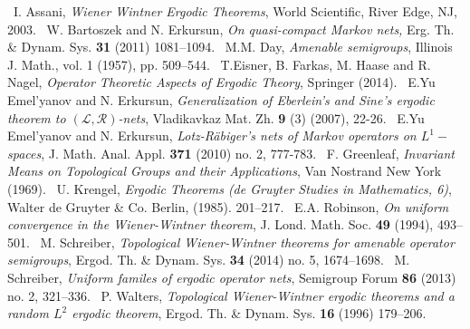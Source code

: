 \documentclass{amsart}
\theoremstyle{definition}
\theoremstyle{remark}
\numberwithin{equation}{section}
\begin{document}
\begin{thebibliography}{12}
\bibitem {} \ I. Assani, {\it Wiener Wintner Ergodic Theorems}, World Scientific,
River Edge, NJ, 2003.
\bibitem {} \ W. Bartoszek and N. Erkursun, {\it On quasi-compact Markov nets,}
Erg. Th. \& Dynam. Sys. {\bf 31} (2011) 1081--1094.
\bibitem {} \ M.M. Day, {\it Amenable semigroups}, Illinois J. Math., vol. 1 (1957),
pp. 509--544.
\bibitem {} \ T.Eisner, B. Farkas, M. Haase and R. Nagel, {\it Operator Theoretic Aspects
of Ergodic Theory}, Springer (2014).
\bibitem {} \ E.Yu Emel'yanov and N. Erkursun, {\it Generalization of Eberlein's
and Sine's ergodic theorem to $(\mathcal{L}, \mathcal{R})$-nets}, Vladikavkaz Mat. Zh.
{\bf 9} (3) (2007), 22-26.
\bibitem {} \ E.Yu Emel'yanov and N. Erkursun, {\it Lotz-R\"abiger's nets of Markov
operators on $L^1-$spaces}, J. Math. Anal. Appl. {\bf 371} (2010) no. 2, 777-783.
\bibitem {} \ F. Greenleaf, {\it Invariant Means on Topological Groups
and their Applications}, Van Nostrand New York (1969).
\bibitem {} \ U. Krengel, {\it Ergodic Theorems (de Gruyter Studies
in Mathematics, 6)}, Walter de Gruyter \& Co. Berlin, (1985).
201--217.
\bibitem {} \ E.A. Robinson, {\it On uniform convergence in the Wiener-Wintner theorem},
J. Lond. Math. Soc. {\bf 49} (1994), 493--501.
\bibitem {}  \ M. Schreiber, {\it Topological Wiener-Wintner theorems for
amenable operator semigroups}, Ergod. Th. \& Dynam. Sys. {\bf 34}
(2014) no. 5, 1674--1698.
\bibitem {} \ M. Schreiber, {\it Uniform familes of ergodic operator nets}, Semigroup Forum
{\bf 86} (2013) no. 2, 321--336.
\bibitem {} \ P. Walters, {\it Topological Wiener-Wintner ergodic theorems
and a random $L^2$ ergodic theorem}, Ergod. Th. \& Dynam. Sys. {\bf 16} (1996) 179--206.

\end{thebibliography}
\end{document}
